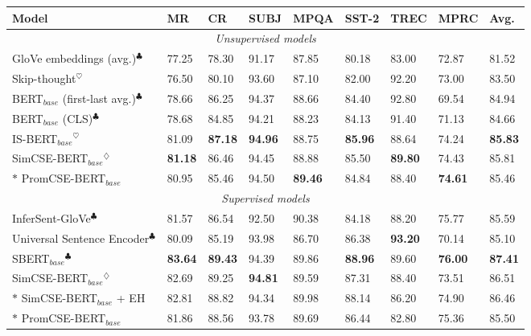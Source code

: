 \documentclass[11pt]{article}
\begin{document}
\begin{table*}[]
\small
\centering
\begin{tabular}{lllllllll}
\toprule
\textbf{Model}                      & \textbf{MR}    & \textbf{CR}    & \textbf{SUBJ}  & \textbf{MPQA}  & \textbf{SST-2}   & \textbf{TREC}  & \textbf{MPRC}  & \textbf{Avg.}  \\
\midrule
\midrule
\multicolumn{9}{c}{\textit{Unsupervised models}} \\\midrule
GloVe embeddings (avg.)$^\clubsuit$    & 77.25 & 78.30  & 91.17 & 87.85 & 80.18 & 83.00    & 72.87 & 81.52 \\
Skip-thought$^\heartsuit$               & 76.50  & 80.10  & 93.60  & 87.10  & 82.00    & 92.20  & 73.00    & 83.50  \\
BERT$_{base}$ (first-last avg.)$^\clubsuit$ & 78.66 & 86.25 & 94.37 & 88.66 & 84.40  & 92.80  & 69.54 & 84.94 \\
BERT$_{base}$ (CLS)$^\clubsuit$             & 78.68 & 84.85 & 94.21 & 88.23 & 84.13 & 91.40  & 71.13 & 84.66 \\
IS-BERT$_{base}$$^\heartsuit$                & 81.09 & \textbf{87.18} & \textbf{94.96} & 88.75 & \textbf{85.96} & 88.64 & 74.24 & \textbf{85.83} \\
SimCSE-BERT$_{base}$$^\diamondsuit$            & \textbf{81.18} & 86.46 & 94.45 & 88.88 & 85.50  & \textbf{89.80}  & 74.43 & 85.81 \\
$*$ PromCSE-BERT$_{base}$           & 80.95 & 85.46 & 94.50  & \textbf{89.46} & 84.84 & 88.40  & \textbf{74.61} & 85.46 \\
\midrule
\midrule
\multicolumn{9}{c}{\textit{Supervised models}} \\\midrule
InferSent-GloVe$^\clubsuit$            & 81.57 & 86.54 & 92.50  & 90.38 & 84.18 & 88.20  & 75.77 & 85.59 \\
Universal Sentence Encoder$^\clubsuit$ & 80.09 & 85.19 & 93.98 & 86.70  & 86.38 & \textbf{93.20}  & 70.14 & 85.10  \\
SBERT$_{base}$$^\clubsuit$                  & \textbf{83.64} & \textbf{89.43} & 94.39 & 89.86 & \textbf{88.96} & 89.60  & \textbf{76.00}    & \textbf{87.41} \\
SimCSE-BERT$_{base}$$^\diamondsuit$            & 82.69 & 89.25 & \textbf{94.81} & 89.59 & 87.31 & 88.40  & 73.51 & 86.51 \\
$*$ SimCSE-BERT$_{base}$ + EH         &82.81       &88.82       &94.34       &89.98       &88.14       &86.20       &74.90       &86.46       \\
$*$ PromCSE-BERT$_{base}$           &81.86       &88.56       &93.78       &89.69       &86.44       &82.80       &75.36       &85.50       \\

\end{tabular}
\end{table*}
\end{document}
